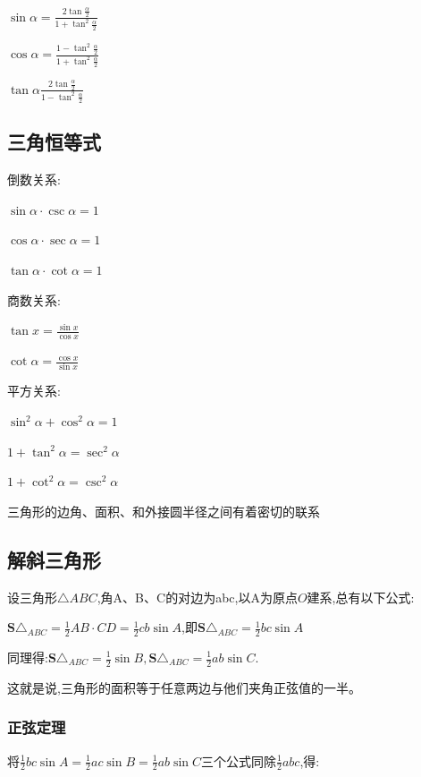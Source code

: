 \documentclass[UTF8]{ctexbook}
\begin{document}
{{{{    $\sin\alpha = \frac{2\tan\frac{\alpha}{2}}{1+\tan^2\frac{\alpha}{2}}$

    $\cos\alpha = \frac{1 - \tan^2\frac{\alpha}{2}}{1 + \tan^2\frac{\alpha}{2}}$

    $\tan\alpha \frac{2\tan\frac{\alpha}{2}}{1 - \tan^2\frac{\alpha}{2}}$
  }%

}%

\subsection{三角恒等式}{

  倒数关系:

  $\sin\alpha \cdot \csc\alpha = 1$

  $\cos\alpha \cdot \sec\alpha = 1$

  $\tan\alpha \cdot \cot\alpha = 1$

  商数关系:

  $\tan{x} = \frac{\sin{x}}{\cos{x}}$

  $\cot\alpha = \frac{\cos x}{\sin x}$

  平方关系:

  $\sin^2\alpha + \cos^2\alpha = 1$

  $1 + \tan^2\alpha = \sec^2\alpha$

  $1 + \cot^2\alpha = \csc^2\alpha$

}%

三角形的边角、面积、和外接圆半径之间有着密切的联系

\subsection{解斜三角形}{
设三角形$\triangle ABC$,角A、B、C的对边为abc,以A为原点$O$建系,总有以下公式:

$\mathbf{S}\triangle_{ABC} = \frac{1}{2}AB \cdot CD = \frac{1}{2}cb\sin A$,即$\mathbf{S}\triangle_{ABC} = \frac{1}{2}bc\sin A$

同理得:$\mathbf{S}\triangle_{ABC} = \frac{1}{2}\sin B, \mathbf{S}\triangle_{ABC} = \frac{1}{2}ab\sin C$.

这就是说,三角形的面积等于任意两边与他们夹角正弦值的一半。

\subsubsection{正弦定理}
将$\frac{1}{2}bc\sin A = \frac{1}{2}ac\sin B = \frac{1}{2}ab\sin C$三个公式同除$\frac{1}{2}abc$,得:

}}}
\end{document}
